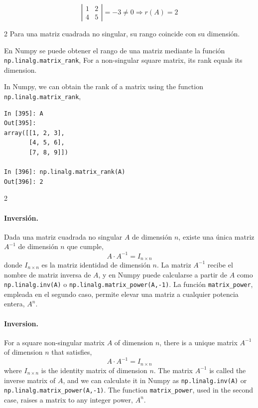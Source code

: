 \begin{equation*}
\left \vert \begin{matrix}
1& 2\\
4& 5
\end{matrix} \right \vert=-3 \neq 0 \Rightarrow r(A)=2
\end{equation*}
\begin{paracol}{2}
Para una matriz cuadrada no singular, su rango coincide con su dimensión.

En Numpy se puede obtener el rango de una matriz mediante la función \texttt{np.linalg.matrix_rank},
\switchcolumn
For a non-singular square matrix, its rank equals its dimension.

In Numpy, we can obtain the rank of a matrix using the function \texttt{np.linalg.matrix_rank},  
\end{paracol}
\begin{center}
\begin{minipage}{0.5\textwidth}
\begin{verbatim}
In [395]: A
Out[395]: 
array([[1, 2, 3],
       [4, 5, 6],
       [7, 8, 9]])

In [396]: np.linalg.matrix_rank(A)
Out[396]: 2
\end{verbatim}
\end{minipage}
\end{center}
\begin{paracol}{2}
\paragraph{Inversión.} Dada una matriz cuadrada no singular $A$ de dimensión $n$, existe una única matriz $A^{-1}$ de dimensión $n$ que cumple,
\begin{equation*}
A\cdot A^{-1}=I_{n\times n}
\end{equation*}
donde $I_{n\times n}$ es la matriz identidad de dimensión $n$.
La matriz $A^{-1}$ recibe el nombre de matriz inversa de $A$, y en Numpy puede calcularse a partir de $A$ como \texttt{np.linalg.inv(A)} o \texttt{np.linalg.matrix_power(A,-1)}.
La función \texttt{matrix_power}, empleada en el segundo caso, permite elevar una matriz a cualquier potencia entera, $A^n$.
\switchcolumn
\paragraph{Inversion.} For a square non-singular matrix $A$ of dimension $n$, there is a unique matrix $A^{-1}$ of dimension $n$ that satisfies,
\begin{equation*}
	A\cdot A^{-1}=I_{n\times n}
\end{equation*}
where $I_{n\times n}$ is the identity matrix of dimension $n$. The matrix $A^{-1}$ is called the inverse matrix of $A$, and we can calculate it in Numpy as \texttt{np.linalg.inv(A)} or \texttt{np.linalg.matrix_power(A,-1)}.
The function \texttt{matrix_power}, used in the second case, raises a matrix to any integer power, $A^n$. 
\end{paracol}
